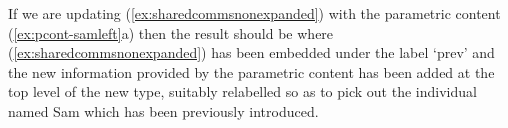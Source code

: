 If we are updating (\ref{ex:sharedcommsnonexpanded}) with the parametric
content (\ref{ex:pcont-samleft}a) then the result should be \nexteg{} where
(\ref{ex:sharedcommsnonexpanded}) has been embedded under the label
`prev' and the new information provided by the parametric content has
been added at the top level of the new type, suitably relabelled so as
to pick out the individual named Sam which has been previously introduced.
\begin{ex}

\end{ex}
